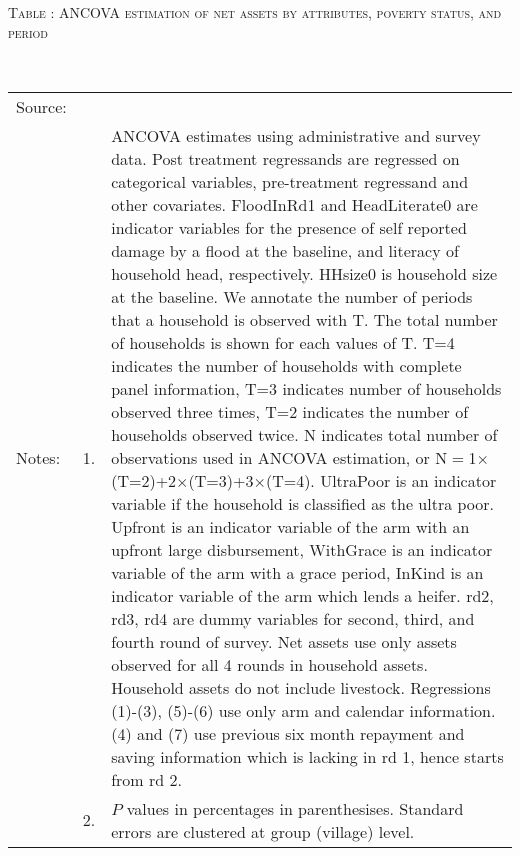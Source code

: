 \hspace{-1cm}\begin{minipage}[t]{14cm}
\hfil\textsc{\normalsize Table \thetable: ANCOVA estimation of net assets by attributes, poverty status, and period\label{tab ANCOVA narrow net assets timevarying poverty status attributes}}\\
\setlength{\tabcolsep}{1pt}
\setlength{\baselineskip}{8pt}
\renewcommand{\arraystretch}{.55}
\hfil{}\\
\renewcommand{\arraystretch}{.8}
\setlength{\tabcolsep}{1pt}
\begin{tabular}{>{\hfill\scriptsize}p{1cm}<{}>{\hfill\scriptsize}p{.25cm}<{}>{\scriptsize}p{12cm}<{\hfill}}
Source:& \multicolumn{2}{l}{\scriptsize Estimated with GUK administrative and survey data.}\\
Notes: & 1. & ANCOVA estimates using administrative and survey data. Post treatment regressands are regressed on categorical variables, pre-treatment regressand and other covariates. \textsf{FloodInRd1} and \textsf{HeadLiterate0} are indicator variables for the presence of self reported damage by a flood at the baseline, and literacy of household head, respectively. \textsf{HHsize0} is household size at the baseline. We annotate the number of periods that a household is observed with \textsf{T}. The total number of households is shown for each values of \textsf{T}. \textsf{T=4} indicates the number of households with complete panel information, \textsf{T=3} indicates number of households observed three times, \textsf{T=2} indicates the number of households observed twice. \textsf{N} indicates total number of observations used in ANCOVA estimation, or \textsf{N$=$1$\times$(T=2)+2$\times$(T=3)+3$\times$(T=4)}.  \textsf{UltraPoor} is an indicator variable if the household is classified as the ultra poor. \textsf{Upfront} is an indicator variable of the arm with an upfront large disbursement, \textsf{WithGrace} is an indicator variable of the arm with a grace period, \textsf{InKind} is an indicator variable of the arm which lends a heifer. \textsf{rd2, rd3, rd4} are dummy variables for second, third, and fourth round of survey. Net assets use only assets observed for all 4 rounds in household assets. Household assets do not include livestock. Regressions (1)-(3), (5)-(6) use only arm and calendar information. (4) and (7) use previous six month repayment and saving information which is lacking in rd 1, hence starts from rd 2.\\
& 2. & $P$ values in percentages in parenthesises. Standard errors are clustered at group (village) level.
\end{tabular}
\end{minipage}
